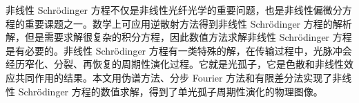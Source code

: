 
\begin{abstractcn}

    非线性 Schr\"odinger 方程不仅是非线性光纤光学的重要问题，也是非线性偏微分方程的重要课题之一。数学上可应用逆散射方法得到非线性 Schr\"odinger 方程的解析解，但是需要求解很复杂的积分方程，因此数值方法求解非线性 Schr\"odinger 方程是有必要的。非线性 Schr\"odinger 方程有一类特殊的解，在传输过程中，光脉冲会经历窄化、分裂、再恢复的周期性演化过程。它就是光孤子，它是色散和非线性效应共同作用的结果。本文用伪谱方法、分步 Fourier 方法和有限差分法实现了非线性 Schr\"odinger 方程的数值求解，得到了单光孤子周期性演化的物理图像。

\end{abstractcn}